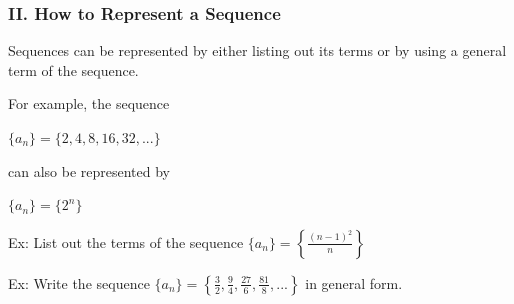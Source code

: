 \begin{frame}
\frametitle{II. How to Represent a Sequence}
\scriptsize

Sequences can be represented by either listing out its terms or by using a general term of the sequence. \\

\vspace{0.2cm}

For example, the sequence 
\begin{center}
	$\{a_n\} = \{2, 4,  8, 16, 32, ...\}$
\end{center}
can also be represented by
\begin{center}
	$\{a_n\} = \{2^n\}$	
\end{center}

Ex: List out the terms of the sequence $\{a_n\} = \left\{\frac{(n-1)^2}{n}\right\}$

\vspace{1.5cm}

Ex: Write the sequence $\{a_n\} = \left\{\frac{3}{2},\frac{9}{4},\frac{27}{6},\frac{81}{8},...\right\}$ in general form.

\vspace{1.5cm}
\end{frame}

